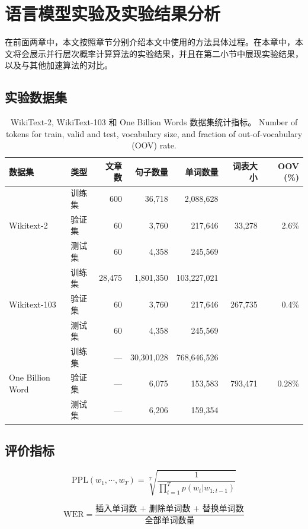 
\chapter{语言模型实验及实验结果分析}
在前面两章中，本文按照章节分别介绍本文中使用的方法具体过程。在本章中，本文将会展示并行层次概率计算算法的实验结果，并且在第二小节中展现实验结果，以及与其他加速算法的对比。
\section{实验数据集}
\begin{table}
  \centering
  \caption{WikiText-2, WikiText-103 和 One Billion Words 数据集统计指标。 Number of tokens for train, valid and test, vocabulary size, and fraction of out-of-vocabulary (OOV) rate.\label{tab:dataset}}
\begin{tabular}{llrrrrr}
\toprule
数据集& 类型& 文章数 & 句子数量 &  单词数量 &词表大小 & OOV (\%) \\ \midrule
\multirow{3}{*}{Wikitext-2} &训练集& 600 & 36,718 & 2,088,628 & \multirow{3}{*}{33,278} & \multirow{3}{*}{2.6\%} \\
&验证集& 60 &3,760 & 217,646  & &\\
&测试集& 60 & 4,358 & 245,569 & &\\
\midrule
\multirow{3}{*}{Wikitext-103} &训练集& 28,475 &  1,801,350 &  103,227,021 & \multirow{3}{*}{267,735} & \multirow{3}{*}{0.4\%} \\
&验证集& 60 &3,760 & 217,646  & &\\
&测试集& 60 & 4,358 & 245,569 & &\\
\midrule
\multirow{3}{*}{One Billion Word} &训练集& --- &30,301,028&768,646,526&   \multirow{3}{*}{793,471} &   \multirow{3}{*}{0.28\%} \\
 &验证集& --- &  6,075 &   153,583 &&\\
 &测试集 & --- &  6,206 &   159,354 &&\\
\bottomrule
\end{tabular}
\end{table}
\section{评价指标}
\begin{equation}\label{equ:ppl}
   \mathrm{PPL}(w_1,\cdots,w_T)=\sqrt[T]{\frac{1}{\prod_{t=1}^T p(w_t|w_{1:t-1})}}
\end{equation}

\begin{equation}\label{equ:wer}
  \mathrm{WER} = \frac{\text{插入单词数 + 删除单词数 + 替换单词数}}{\text{全部单词数量}}
\end{equation}


